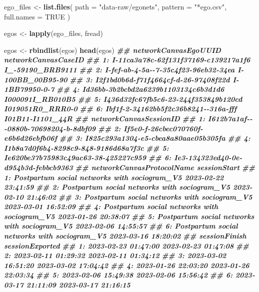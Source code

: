 \documentclass[
]{book}
\newenvironment{Shaded}{\begin{snugshade}}{\end{snugshade}}
\newcommand{\AttributeTok}[1]{\textcolor[rgb]{0.13,0.29,0.53}{#1}}
\newcommand{\ConstantTok}[1]{\textcolor[rgb]{0.56,0.35,0.01}{#1}}
\newcommand{\DocumentationTok}[1]{\textcolor[rgb]{0.56,0.35,0.01}{\textbf{\textit{#1}}}}
\newcommand{\FunctionTok}[1]{\textcolor[rgb]{0.13,0.29,0.53}{\textbf{#1}}}
\newcommand{\NormalTok}[1]{#1}
\newcommand{\OtherTok}[1]{\textcolor[rgb]{0.56,0.35,0.01}{#1}}
\newcommand{\StringTok}[1]{\textcolor[rgb]{0.31,0.60,0.02}{#1}}
\begin{document}
\begin{Shaded}
\begin{Highlighting}[]
\NormalTok{ego\_files }\OtherTok{\textless{}{-}} \FunctionTok{list.files}\NormalTok{(}
  \AttributeTok{path       =} \StringTok{"data{-}raw/egonets"}\NormalTok{,}
  \AttributeTok{pattern    =} \StringTok{"*ego.csv"}\NormalTok{,}
  \AttributeTok{full.names =} \ConstantTok{TRUE}
\NormalTok{  )}

\NormalTok{egos }\OtherTok{\textless{}{-}} \FunctionTok{lapply}\NormalTok{(ego\_files, fread)}

\NormalTok{egos }\OtherTok{\textless{}{-}} \FunctionTok{rbindlist}\NormalTok{(egos)}
\FunctionTok{head}\NormalTok{(egos)}
\DocumentationTok{\#\#                    networkCanvasEgoUUID networkCanvasCaseID}
\DocumentationTok{\#\# 1: I{-}11ca3a78c{-}62f131f37169{-}c139217a1f6    I\_{-}59190\_BRB9111}
\DocumentationTok{\#\# 2: I{-}fef{-}ab{-}4{-}5a{-}{-}7{-}35c4f23{-}96eb32{-}34ea    I{-}100BB\_00B95{-}90}
\DocumentationTok{\#\# 3: I2f1bd0b6d{-}f71f4664cf{-}d{-}26{-}97408f22d      I{-}1BB79950{-}0{-}7}
\DocumentationTok{\#\# 4: Id36bb{-}3b2bcbd2a6239b1103134c6b3d1d6    I000091I\_RB010B5}
\DocumentationTok{\#\# 5: I436d32fc67fb5c6{-}23{-}244f353849b120cd    I019051R0\_RRR0{-}0}
\DocumentationTok{\#\# 6: Ibf1f{-}2{-}34162bb5f2c36b8241{-}{-}316a{-}fff    I01B11{-}I1101\_44R}
\DocumentationTok{\#\#                  networkCanvasSessionID}
\DocumentationTok{\#\# 1: I612b7a1af{-}{-}{-}0880b{-}70698204{-}b{-}8dbf09}
\DocumentationTok{\#\# 2: If5e0{-}f{-}26cbec070760f{-}e6b6d26ebfb06f}
\DocumentationTok{\#\# 3: I825c293a1304{-}e5{-}cbea8a80aae05b305fa}
\DocumentationTok{\#\# 4: I1b8a7d0f6b4{-}8298c9{-}848{-}9186d68a7f3c}
\DocumentationTok{\#\# 5: Ie620be37b75983c49ac63{-}38{-}425227c959}
\DocumentationTok{\#\# 6: Ie3{-}134323ed40{-}0e{-}d954b3d{-}febbcb9363}
\DocumentationTok{\#\#                       networkCanvasProtocolName        sessionStart}
\DocumentationTok{\#\# 1: Postpartum social networks with sociogram\_V5 2023{-}02{-}22 23:41:59}
\DocumentationTok{\#\# 2: Postpartum social networks with sociogram\_V5 2023{-}02{-}10 21:46:02}
\DocumentationTok{\#\# 3: Postpartum social networks with sociogram\_V5 2023{-}03{-}01 16:52:09}
\DocumentationTok{\#\# 4: Postpartum social networks with sociogram\_V5 2023{-}01{-}26 20:38:07}
\DocumentationTok{\#\# 5: Postpartum social networks with sociogram\_V5 2023{-}02{-}06 14:55:57}
\DocumentationTok{\#\# 6: Postpartum social networks with sociogram\_V5 2023{-}03{-}16 18:20:02}
\DocumentationTok{\#\#          sessionFinish     sessionExported}
\DocumentationTok{\#\# 1: 2023{-}02{-}23 01:47:00 2023{-}02{-}23 01:47:08}
\DocumentationTok{\#\# 2: 2023{-}02{-}11 01:29:32 2023{-}02{-}11 01:34:12}
\DocumentationTok{\#\# 3: 2023{-}03{-}02 16:51:20 2023{-}03{-}02 17:04:42}
\DocumentationTok{\#\# 4: 2023{-}01{-}26 22:03:20 2023{-}01{-}26 22:03:34}
\DocumentationTok{\#\# 5: 2023{-}02{-}06 15:49:38 2023{-}02{-}06 15:56:42}
\DocumentationTok{\#\# 6: 2023{-}03{-}17 21:11:09 2023{-}03{-}17 21:16:15}
\end{Highlighting}
\end{Shaded}
\end{document}
